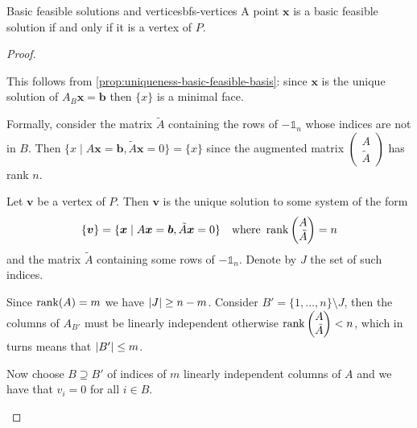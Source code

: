 \documentclass[12pt]{extarticle}
\renewcommand{\vec}[1]{\bm{#1}}
\begin{document}
\begin{proposition}{Basic feasible solutions and vertices}{bfs-vertices}
	A point $\vec x$ is a basic feasible solution if and only if it is a vertex of $P$.
\end{proposition}
\begin{proof}
	\begin{description}[font=\normalfont\itshape]
		\item[Basic feasible solution implies vertex]
		      This follows from \cref{prop:uniqueness-basic-feasible-basis}:
		      since $\vec x$ is the unique solution of $A_B \vec x = \vec b$ then $\{x\}$ is a minimal
		      face.

		      Formally, consider the matrix $\tilde A$ containing the rows of $-\mathds 1_n$ whose
		      indices are not in $B$.
		      Then $\{x \mid A \vec x = \vec b, \tilde A \vec x = 0\} = \{ x\}$ since the augmented
		      matrix $\begin{pmatrix} A \\ \tilde A \end{pmatrix}$ has rank $n$.

		\item[Vertex implies basic feasible solution]
		      Let $\vec v$ be a vertex of $P$.
		      Then $\vec v$ is the unique solution to some system of the form
		      \begin{equation}
			      \{ \vec v \} = \{ \vec x \mid A \vec x = \vec b, \tilde A \vec x = 0\} \quad \text{where }
			      \rank\begin{pmatrix}A \\ \tilde A \end{pmatrix} = n
		      \end{equation}
		      and the matrix $\tilde A$ containing some rows of $-\mathds 1_n$.
		      Denote by $J$ the set of such indices.

		      Since $\rank(A) = m$ we have $\abs{J} \geq n - m$.
		      Consider $B' = \{1, \dots, n\} \setminus J$, then the columns of $A_{B'}$ must
		      be linearly independent otherwise $\rank \begin{pmatrix}A \\ \tilde A \end{pmatrix} < n$,
		      which in turns means that $\abs{B'} \leq m$.

		      Now choose $B \supseteq B'$ of indices of $m$ linearly independent columns of $A$
		      and we have that $v_i = 0$ for all $i \in B$.
		      \qedhere
	\end{description}
\end{proof}
\end{document}
